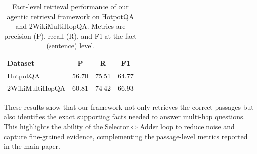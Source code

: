 \documentclass{article} %
\begin{document}
\begin{table}[h]
\centering
\small
\caption{Fact-level retrieval performance of our agentic retrieval framework on HotpotQA and 2WikiMultiHopQA. Metrics are precision (P), recall (R), and F1 at the fact (sentence) level.}
\begin{tabular}{l|ccc}
\toprule
\textbf{Dataset} & \textbf{P} & \textbf{R} & \textbf{F1} \\
\midrule
HotpotQA & 56.70 & 75.51 & 64.77 \\
\midrule
2WikiMultiHopQA & 60.81 & 74.42 & 66.93 \\
\bottomrule
\end{tabular}
\label{tab:sentence_retrieval}
\end{table}

These results show that our framework not only retrieves the correct passages but also identifies the exact supporting facts needed to answer multi-hop questions. This highlights the ability of the Selector$\Leftrightarrow$Adder loop to reduce noise and capture fine-grained evidence, complementing the passage-level metrics reported in the main paper.
\end{document}
